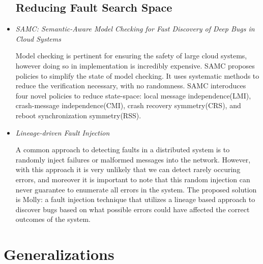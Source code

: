\documentclass{article}
\begin{document}
\begin{itemize}
	\subsection{Reducing Fault Search Space}

	\item
	\textit{SAMC: Semantic-Aware Model Checking for Fast Discovery of Deep Bugs in Cloud Systems} \cite{SAMC}

	Model checking is pertinent for ensuring the safety of large cloud systems, however doing so in implementation is incredibly expensive. SAMC proposes policies to simplify the state of model checking.
	It uses systematic methods to reduce the verification necessary, with no randomness. 
	SAMC interoduces four novel policies to reduce state-space: local message independence(LMI), crash-message independence(CMI), crash recovery symmetry(CRS), and reboot synchronization symmetry(RSS).

	\item
	\textit{Lineage-driven Fault Injection} \cite{Molly}

	A common approach to detecting faults in a distributed system is to randomly inject failures or malformed messages into the network.
	However, with this approach it is very unlikely that we can detect rarely occuring errors, and moreover it is important to note that this random injection can never guarantee to enumerate all errors in the system.
	The proposed solution is Molly: a fault injection technique that utilizes a lineage based approach to discover bugs based on what possible errors could have affected the correct outcomes of the system.
	
\end{itemize}

\section{Generalizations}
\end{document}
